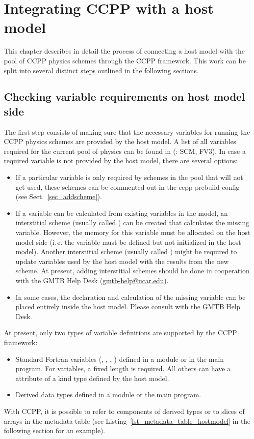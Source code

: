 \chapter{Integrating CCPP with a host model}
\label{chap_hostmodel}
\setlength{\parskip}{12pt}
This chapter describes in detail the process of connecting a host model with the pool of CCPP physics schemes through the CCPP framework. This work can be split into several distinct steps outlined in the following sections.

\section{Checking variable requirements on host model side}
The first step consists of making sure that the necessary variables for running the CCPP physics schemes are provided by the host model. A list of all variables required for the current pool of physics can be found in  (: SCM, FV3). In case a required variable is not provided by the host model, there are several options:
\begin{itemize}
\item If a particular variable is only required by schemes in the pool that will not get used, these schemes can be commented out in the ccpp prebuild config (see Sect.~\ref{sec_addscheme}).
\item If a variable can be calculated from existing variables in the model, an interstitial scheme (usually called ) can be created that calculates the missing variable. However, the memory for this variable must be allocated on the host model side (i.\,e. the variable must be defined but not initialized in the host model). Another interstitial scheme (usually called ) might be required to update variables used by the host model with the results from the new scheme. At present, adding interstitial schemes should be done in cooperation with the GMTB Help Desk (\url{gmtb-help@ucar.edu}).
\item In some cases, the declaration and calculation of the missing variable can be placed entirely inside the host model. Please consult with the GMTB Help Desk.
\end{itemize}

At present, only two types of variable definitions are supported by the CCPP framework:
\begin{itemize}
\item Standard Fortran variables (, , , ) defined in a module or in the main program. For  variables, a fixed length is required. All others can have a  attribute of a kind type defined by the host model.
\item Derived data types defined in a module or the main program.
\end{itemize}
With CCPP, it is possible to refer to components of derived types or to slices of arrays in the metadata table (see Listing~\ref{lst_metadata_table_hostmodel} in the following section for an example).


